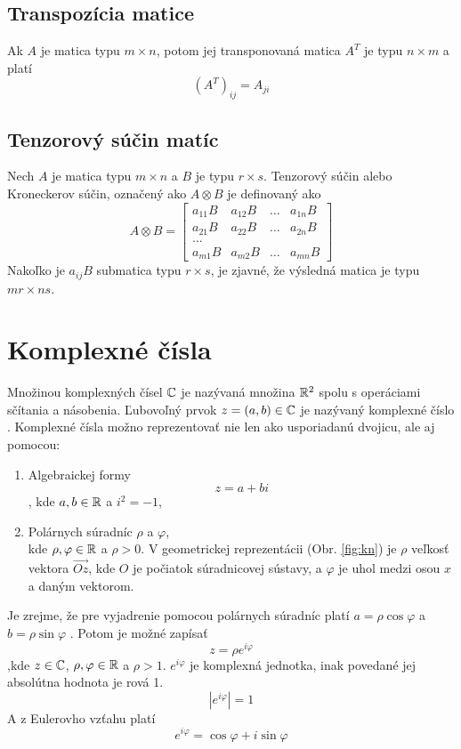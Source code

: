 \subsection{Transpozícia matice}
Ak \(A\) je matica typu \(m \times n\), potom jej transponovaná matica \(A^{T}\) je typu \(n \times m\) a platí \cite{Ste18} \[(A^{T})_{ij} = A_{ji}\]

\subsection{Tenzorový súčin matíc}
Nech \(A\) je matica typu \(m \times n\) a \(B\) je typu \(r \times s\).
Tenzorový súčin alebo Kroneckerov súčin, označený ako \(A \otimes B\) je definovaný ako \cite{Gra81}
 \[
A \otimes B = \begin{bmatrix}
		a_{11}B & a_{12}B & \dots & a_{1n}B \\
		a_{21}B & a_{22}B & \dots & a_{2n}B \\
		{...}							\\
		a_{m1}B & a_{m2}B & \dots & a_{mn}B
     \end{bmatrix}
\]
Nakoľko je \(a_{ij}B\) submatica typu \(r \times s\), je zjavné, že výsledná matica je typu \(mr \times ns\).

\section{Komplexné čísla}
Množinou komplexných čísel \(\mathbb{C}\) je nazývaná množina \(\mathbb{R}^2\) spolu s operáciami sčítania a násobenia. Ľubovoľný prvok \(z = (a, b) \in \mathbb{C}\) je nazývaný komplexné číslo \cite{Tit06}.
Komplexné čísla možno reprezentovať nie len ako usporiadanú dvojicu, ale aj pomocou:
\begin{enumerate}
\item Algebraickej formy \[z = a + bi\], kde \(a,b \in \mathbb{R}\) a \(i^{2} = -1\),
\item Polárnych súradníc \(\rho\) a \(\varphi\), \\
kde \(\rho,\varphi \in \mathbb{R}\) a \(\rho > 0\).
V geometrickej reprezentácii (Obr. \ref{fig:kn}) je \(\rho\) veľkosť vektora \(\vec{Oz}\), kde \(O\) je počiatok súradnicovej sústavy, a \(\varphi\) je uhol medzi osou \(x\) a daným vektorom.
\end{enumerate}
Je zrejme, že pre vyjadrenie pomocou polárnych súradníc platí \(a = \rho \cos \varphi\) a \(b = \rho \sin \varphi\) \cite{Tit06}.
Potom je možné zapísať \[z = \rho e^{i \varphi}\] ,kde \(z \in \mathbb{C}\), \(\rho , \varphi \in \mathbb{R}\) a \(\rho > 1\).
\(e^{i \varphi}\) je komplexná jednotka, inak povedané jej absolútna hodnota je rová 1.
\[|e^{i \varphi}| = 1\]
A z Eulerovho vzťahu platí
\[e^{i \varphi} = \cos \varphi + i\sin \varphi\]

